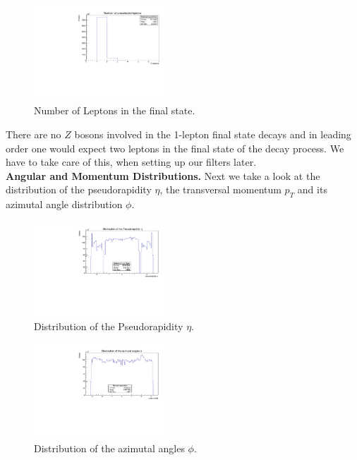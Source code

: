 \documentclass[twocolumn,
			   showpacs,%
               nofootinbib,
               aps,%
               prd,
               notitlepage,
               showkeys,
               10pt]{revtex4-1}
\begin{document}
\begin{figure}[H]
	\centering
	\includegraphics[width=0.45\textwidth]{figures/plots/NLeptons}
	\caption{Number of Leptons in the final state.}
\end{figure}
There are no $Z$ bosons involved in the 1-lepton final state decays and in leading order one would expect two leptons in the final state of the decay process. We have to take care of this, when setting up our filters later.\\

\textbf{Angular and Momentum Distributions.}  
Next we take a look at the distribution of  the pseudorapidity $\eta$, the transversal momentum $p_T$ and its azimutal angle distribution $\phi$.

\begin{figure}[H]
	\centering
	\includegraphics[width=0.45\textwidth]{figures/plots/Pseudorapidity}
	\caption{Distribution of the Pseudorapidity $\eta$.}
\end{figure}

\begin{figure}[H]
	\centering
	\includegraphics[width=0.45\textwidth]{figures/plots/AzimutalAngle}
	\caption{Distribution of the azimutal angles $\phi$.}
\end{figure}
\end{document}
